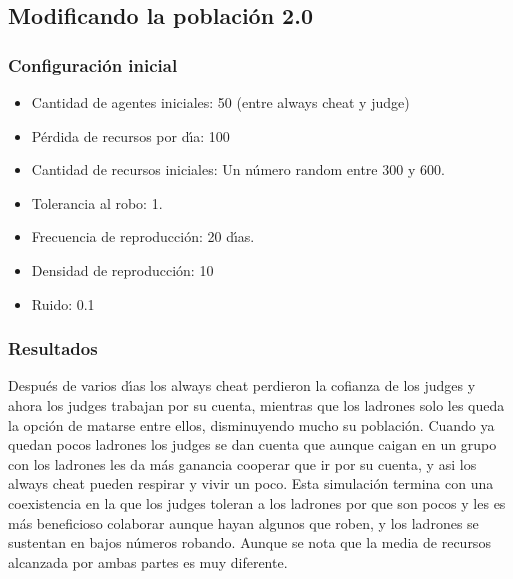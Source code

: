 \documentclass{article}
\begin{document}
\subsection{Modificando la poblaci\'on 2.0}
\subsubsection{Configuraci\'on inicial}
\begin{itemize}
      \item Cantidad de agentes iniciales: 50 (entre always cheat y judge)
      \item P\'erdida de recursos por d\'{\i}a: 100
      \item Cantidad de recursos iniciales: Un n\'umero random entre 300 y 600.
      \item Tolerancia al robo: 1.
      \item Frecuencia de reproducci\'on: 20 d\'{\i}as.
      \item Densidad de reproducci\'on: 10
      \item Ruido: 0.1
\end{itemize}

\subsubsection{Resultados}
Despu\'es de varios d\'{\i}as los always cheat perdieron la cofianza de los judges y ahora los judges trabajan por su cuenta, mientras que los ladrones solo les queda la opci\'on de matarse
entre ellos, disminuyendo mucho su poblaci\'on. Cuando ya quedan pocos ladrones los judges se dan cuenta que aunque caigan en un grupo con los ladrones les da m\'as ganancia cooperar que ir
por su cuenta, y asi los always cheat pueden respirar y vivir un poco. Esta simulación termina con una coexistencia en la que los judges toleran a los ladrones por que son pocos y les es m\'as
beneficioso colaborar aunque hayan algunos que roben, y los ladrones se sustentan en bajos n\'umeros robando. Aunque se nota que la media de recursos alcanzada por ambas partes es muy diferente.
\end{document}
